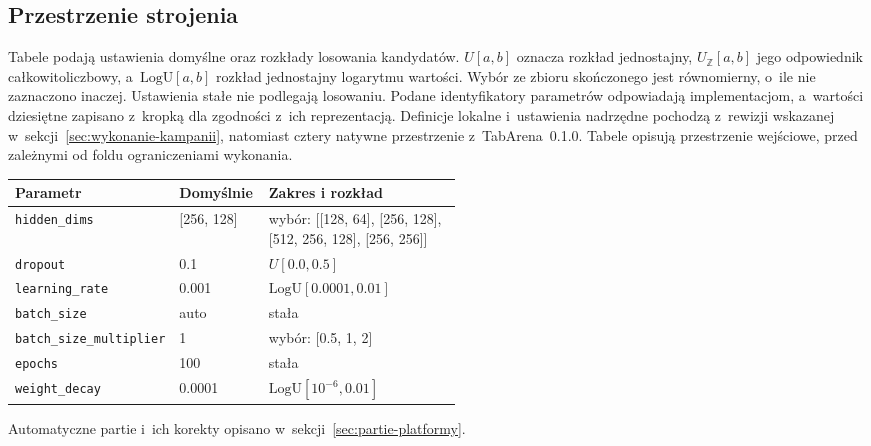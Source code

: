 \label{app:reguly-szczegolowe}

\subsection*{Przestrzenie strojenia}
\label{app:przestrzenie}

Tabele podają ustawienia domyślne oraz rozkłady losowania kandydatów. $U[a,b]$ oznacza rozkład jednostajny, $U_{\mathbb Z}[a,b]$ jego odpowiednik całkowitoliczbowy, a~$\mathrm{LogU}[a,b]$ rozkład jednostajny logarytmu wartości. Wybór ze zbioru skończonego jest równomierny, o~ile nie zaznaczono inaczej. Ustawienia stałe nie podlegają losowaniu. Podane identyfikatory parametrów odpowiadają implementacjom, a~wartości dziesiętne zapisano z~kropką dla zgodności z~ich reprezentacją. Definicje lokalne i~ustawienia nadrzędne pochodzą z~rewizji wskazanej w~sekcji~\ref{sec:wykonanie-kampanii}, natomiast cztery natywne przestrzenie z~TabArena~0.1.0. Tabele opisują przestrzenie wejściowe, przed zależnymi od foldu ograniczeniami wykonania.

\par\medskip\noindent\begin{minipage}{\linewidth}\captionsetup{hypcap=false}\centering\footnotesize
{}
\begin{tabularx}{\linewidth}{@{}P{0.32\linewidth}P{0.20\linewidth}Y@{}}
\toprule Parametr & Domyślnie & Zakres i rozkład \\
\midrule
\texttt{hidden\_dims} & [256, 128] & wybór: [[128, 64], [256, 128], [512, 256, 128], [256, 256]] \\
\texttt{dropout} & 0.1 & $U[0.0, 0.5]$ \\
\texttt{learning\_rate} & 0.001 & $\mathrm{LogU}[0.0001, 0.01]$ \\
\texttt{batch\_size} & auto & stała \\
\texttt{batch\_size\_multiplier} & 1 & wybór: [0.5, 1, 2] \\
\texttt{epochs} & 100 & stała \\
\texttt{weight\_decay} & 0.0001 & $\mathrm{LogU}[10^{-6}, 0.01]$ \\
\bottomrule\end{tabularx}\end{minipage}\par\medskip

Automatyczne partie i~ich korekty opisano w~sekcji~\ref{sec:partie-platformy}.

